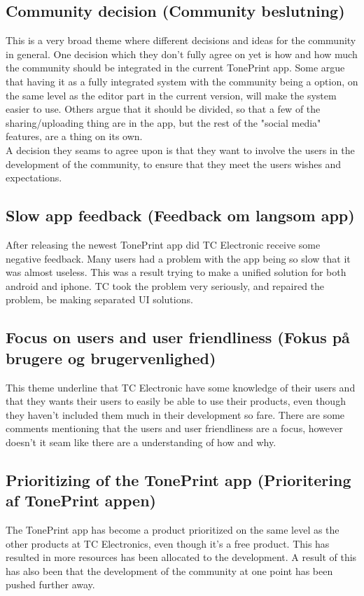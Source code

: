 \subsection*{Community decision (Community beslutning)} 
\label{ThemeCommunityDecision}
This is a very broad theme where different decisions and ideas for the community in general. One decision which they don't fully agree on yet is how and how much the community should be integrated in the current TonePrint app. Some argue that having it as a fully integrated system with the community being a option, on the same level as the editor part in the current version, will make the system easier to use. Others argue that it should be divided, so that a few of the sharing/uploading thing are in the app, but the rest of the "social media" features, are a thing on its own. \\
A decision they seams to agree upon is that they want to involve the users in the development of the community, to ensure that they meet the users wishes and expectations. 

\subsection*{Slow app feedback (Feedback om langsom app)} 
\label{ThemeSlowAppFeedback}
After releasing the newest TonePrint app did TC Electronic receive some negative feedback. Many users had a problem with the app being so slow that it was almost useless. This was a result trying to make a unified solution for both android and iphone. TC took the problem very seriously, and repaired the problem, be making separated UI solutions. 

\subsection*{Focus on users and user friendliness (Fokus på brugere og brugervenlighed)} 
\label{ThemeFocusOnUsersAndUserFriendliness}
This theme underline that TC Electronic have some knowledge of their users and that they wants their users to easily be able to use their products, even though they haven't included them much in their development so fare. There are some comments mentioning that the users and user friendliness are a focus, however doesn't it seam like there are a understanding of how and why.

\subsection*{Prioritizing of the TonePrint app (Prioritering af TonePrint appen)} 
\label{ThemePrioritizingOfTheTonePrintApp}
The TonePrint app has become a product prioritized on the same level as the other products at TC Electronics, even though it's a free product. This has resulted in more resources has been allocated to the development. A result of this has also been that the development of the community at one point has been pushed further away.

